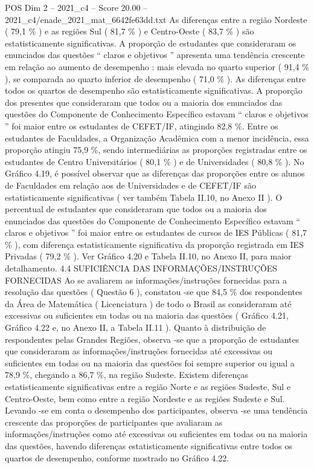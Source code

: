 \begin{textsample}{POS Dim 2 – 2021\_c4 – Score 20.00 – 2021\_c4/enade\_2021\_mat\_6642fe63dd.txt}
As diferenças entre a região Nordeste ( 79,1 \% ) e as regiões Sul ( 81,7 \% ) e Centro-Oeste ( 83,7 \% ) são estatisticamente significativas.
A proporção de estudantes que consideraram os enunciados das questões “ claros e objetivos ” apresenta uma tendência crescente em relação ao aumento de desempenho : mais elevada no quarto superior ( 91,4 \% ), se comparada ao quarto inferior de desempenho ( 71,0 \% ).
As diferenças entre todos os quartos de desempenho são estatisticamente significativas.
A proporção dos presentes que consideraram que todos ou a maioria dos enunciados das questões do Componente de Conhecimento Específico estavam “ claros e objetivos ” foi maior entre os estudantes de CEFET/IF, atingindo 82,8 \%.
Entre os estudantes de Faculdades, a Organização Acadêmica com a menor incidência, essa proporção atingiu 75,9 \%, sendo intermediárias as proporções registradas entre os estudantes de Centro Universitários ( 80,1 \% ) e de Universidades ( 80,8 \% ).
No Gráfico 4.19, é possível observar que as diferenças das proporções entre os alunos de Faculdades em relação aos de Universidades e de CEFET/IF são estatisticamente significativas ( ver também Tabela II.10, no Anexo II ).
O percentual de estudantes que consideraram que todos ou a maioria dos enunciados das questões do Componente de Conhecimento Específico estavam “ claros e objetivos ” foi maior entre os estudantes de cursos de IES Públicas ( 81,7 \% ), com diferença estatisticamente significativa da proporção registrada em IES Privadas ( 79,2 \% ).
Ver Gráfico 4.20 e Tabela II.10, no Anexo II, para maior detalhamento. 4.4 SUFICIÊNCIA DAS INFORMAÇÕES/INSTRUÇÕES FORNECIDAS Ao se avaliarem as informações/instruções fornecidas para a resolução das questões ( Questão 6 ), constatou -se que 84,5 \% dos respondentes da Área de Matemática ( Licenciatura ) de todo o Brasil as consideraram até excessivas ou suficientes em todas ou na maioria das questões ( Gráfico 4.21, Gráfico 4.22 e, no Anexo II, a Tabela II.11 ).
Quanto à distribuição de respondentes pelas Grandes Regiões, observa -se que a proporção de estudantes que consideraram as informações/instruções fornecidas até excessivas ou suficientes em todas ou na maioria das questões foi sempre superior ou igual a 78,9 \%, chegando a 86,7 \%, na região Sudeste.
Existem diferenças estatisticamente significativas entre a região Norte e as regiões Sudeste, Sul e Centro-Oeste, bem como entre a região Nordeste e as regiões Sudeste e Sul.
Levando -se em conta o desempenho dos participantes, observa -se uma tendência crescente das proporções de participantes que avaliaram as informações/instruções como até excessivas ou suficientes em todas ou na maioria das questões, havendo diferenças estatisticamente significativas entre todos os quartos de desempenho, conforme mostrado no Gráfico 4.22.

\end{textsample}
